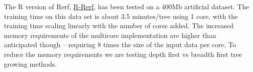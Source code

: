 \documentclass[simplex.tex]{subfiles}
\begin{document}
The R version of Rerf, \href{https://github.com/neurodata/R-RerF}{R-Rerf}, has been tested on a 400Mb artificial dataset.  The training time on this data set is about 3.5 minutes/tree using 1 core, with the training time scaling linearly with the number of cores added.  The increased memory requirements of the multicore implementation are higher than anticipated though -- requiring 8 times the size of the input data per core.  To reduce the memory requirements we are testing depth first vs breadth first tree growing methods.  

\clearpage
\end{document}
